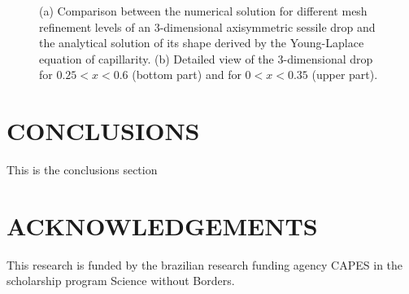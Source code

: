 \documentclass{wccm2014}
\begin{document}
\begin{figure}[ht!]
\begin{center}
	\end{center}
	\caption{(a) Comparison between the numerical solution for
	 different mesh refinement levels of an 3-dimensional axisymmetric
	 sessile drop and the analytical solution of its shape derived by
	 the Young-Laplace equation of capillarity. (b) Detailed view of the
	3-dimensional drop for $0.25<x<0.6$ (bottom part) and for $0<x<0.35$
  (upper part). }
	\label{fig:sessileShape} 
\end{figure}

\section{CONCLUSIONS}
\label{sec:conclusions}
This is the conclusions section
\section{ACKNOWLEDGEMENTS}
\label{sec:acknowledgements}
This research is funded by the brazilian research funding agency CAPES
in the scholarship program Science without Borders.




\end{document}
